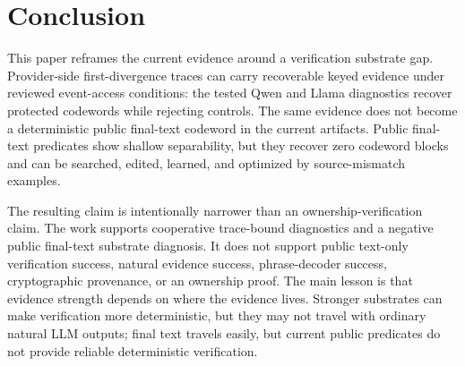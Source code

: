 \section{Conclusion}
\label{sec:conclusion}

This paper reframes the current evidence around a verification substrate gap.
Provider-side first-divergence traces can carry recoverable keyed evidence
under reviewed event-access conditions: the tested Qwen and Llama diagnostics
recover protected codewords while rejecting controls.  The same evidence does
not become a deterministic public final-text codeword in the current artifacts.
Public final-text predicates show shallow separability, but they recover zero
codeword blocks and can be searched, edited, learned, and optimized by
source-mismatch examples.

The resulting claim is intentionally narrower than an ownership-verification
claim.  The work supports cooperative trace-bound diagnostics and a negative
public final-text substrate diagnosis.  It does not support public text-only
verification success, natural evidence success, phrase-decoder success,
cryptographic provenance, or an ownership proof.  The main lesson is that
evidence strength depends on where the evidence lives.  Stronger substrates
can make verification more deterministic, but they may not travel with ordinary
natural LLM outputs; final text travels easily, but current public predicates
do not provide reliable deterministic verification.
